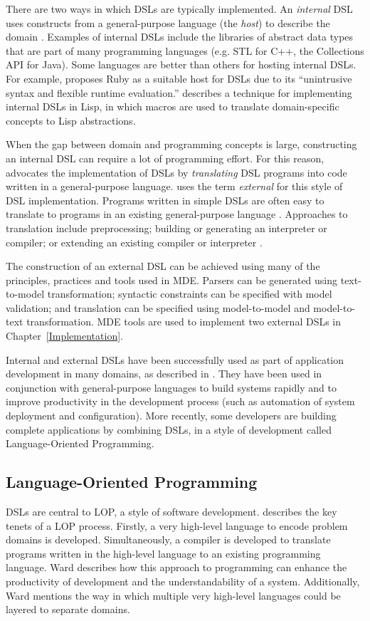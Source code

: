 There are two ways in which DSLs are typically implemented. An \emph{internal} DSL uses constructs from a general-purpose language (the \emph{host}) to describe the domain \cite{fowler10dsls}. Examples of internal DSLs include the libraries of abstract data types that are part of many programming languages (e.g. STL for C++, the Collections API for Java). Some languages are better than others for hosting internal DSLs. For example, \cite{fowler10dsls} proposes Ruby as a suitable host for DSLs due to its ``unintrusive syntax and flexible runtime evaluation.'' \cite{graham93lisp} describes a technique for implementing internal DSLs in Lisp, in which macros are used to translate domain-specific concepts to Lisp abstractions.

When the gap between domain and programming concepts is large, constructing an internal DSL can require a lot of programming effort. For this reason, \cite{parr07antlr} advocates the implementation of DSLs by \emph{translating} DSL programs into code written in a general-purpose language. \cite{fowler10dsls} uses the term \emph{external} for this style of DSL implementation. Programs written in simple DSLs are often easy to translate to programs in an existing general-purpose language \cite{parr07antlr}. Approaches to translation include preprocessing; building or generating an interpreter or compiler; or extending an existing compiler or interpreter \cite{fowler10dsls}.

The construction of an external DSL can be achieved using many of the principles, practices and tools used in MDE. Parsers can be generated using text-to-model transformation; syntactic constraints can be specified with model validation; and translation can be specified using model-to-model and model-to-text transformation. MDE tools are used to implement two external DSLs in Chapter~\ref{Implementation}.

Internal and external DSLs have been successfully used as part of application development in many domains, as described in \cite{deursen00dslbib}. They have been used in conjunction with general-purpose languages to build systems rapidly and to improve productivity in the development process (such as automation of system deployment and configuration). More recently, some developers are building complete applications by combining DSLs, in a style of development called Language-Oriented Programming. 

\subsection{Language-Oriented Programming}
DSLs are central to LOP, a style of software development. \cite{ward94lop} describes the key tenets of a LOP process. Firstly, a very high-level language to encode problem domains is developed. Simultaneously, a compiler is developed to translate programs written in the high-level language to an existing programming language. Ward describes how this approach to programming can enhance the productivity of development and the understandability of a system. Additionally, Ward mentions the way in which multiple very high-level languages could be layered to separate domains.

